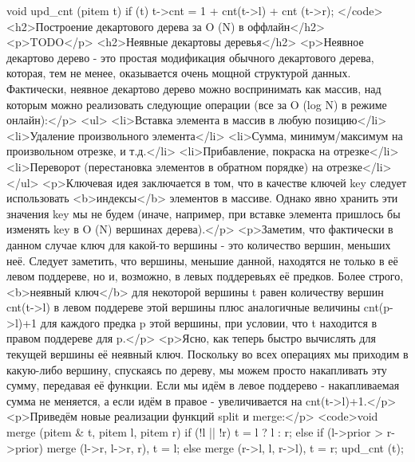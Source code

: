 void upd_cnt (pitem t) {
	if (t)
		t->cnt = 1 + cnt(t->l) + cnt (t->r);
}</code>
<h2>Построение декартового дерева за O (N) в оффлайн</h2>
<p>TODO</p>
<h2>Неявные декартовы деревья</h2>
<p>Неявное декартово дерево - это простая модификация обычного декартового дерева, которая, тем не менее, оказывается очень мощной структурой данных. Фактически, неявное декартово дерево можно воспринимать как массив, над которым можно реализовать следующие операции (все за O (log N) в режиме онлайн):</p>
<ul>
<li>Вставка элемента в массив в любую позицию</li>
<li>Удаление произвольного элемента</li>
<li>Сумма, минимум/максимум на произвольном отрезке, и т.д.</li>
<li>Прибавление, покраска на отрезке</li>
<li>Переворот (перестановка элементов в обратном порядке) на отрезке</li>
</ul>
<p>Ключевая идея заключается в том, что в качестве ключей key следует использовать <b>индексы</b> элементов в массиве. Однако явно хранить эти значения key мы не будем (иначе, например, при вставке элемента пришлось бы изменять key в O (N) вершинах дерева).</p>
<p>Заметим, что фактически в данном случае ключ для какой-то вершины - это количество вершин, меньших неё. Следует заметить, что вершины, меньшие данной, находятся не только в её левом поддереве, но и, возможно, в левых поддеревьях её предков. Более строго, <b>неявный ключ</b> для некоторой вершины t равен количеству вершин cnt(t->l) в левом поддереве этой вершины плюс аналогичные величины cnt(p->l)+1 для каждого предка p этой вершины, при условии, что t находится в правом поддереве для p.</p>
<p>Ясно, как теперь быстро вычислять для текущей вершины её неявный ключ. Поскольку во всех операциях мы приходим в какую-либо вершину, спускаясь по дереву, мы можем просто накапливать эту сумму, передавая её функции. Если мы идём в левое поддерево - накапливаемая сумма не меняется, а если идём в правое - увеличивается на cnt(t->l)+1.</p>
<p>Приведём новые реализации функций split и merge:</p>
<code>void merge (pitem & t, pitem l, pitem r) {
	if (!l || !r)
		t = l ? l : r;
	else if (l->prior > r->prior)
		merge (l->r, l->r, r),  t = l;
	else
		merge (r->l, l, r->l),  t = r;
	upd_cnt (t);
}

